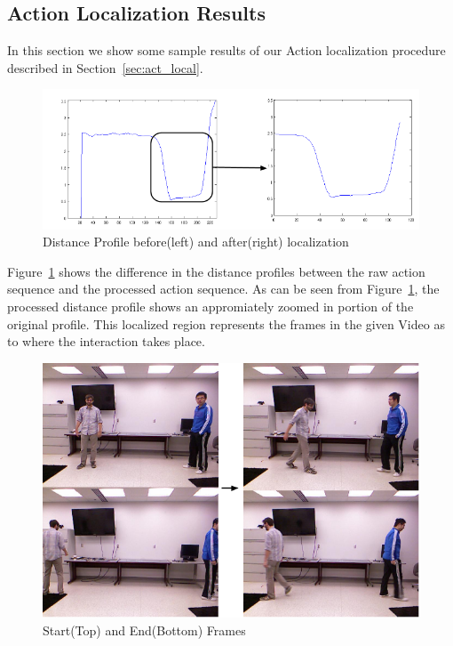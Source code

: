 \documentclass[10pt,twocolumn,letterpaper]{article}
\begin{document}

\subsection{Action Localization Results}
In this section we show some sample results of our Action localization procedure described in Section~\ref{sec:act_local}. 
\begin{figure}[ht]

\includegraphics[scale=0.3]{act_local.png}
\caption{Distance Profile before(left) and after(right) localization}
\label{Fig:act_loc}

\end{figure}
Figure~\ref{Fig:act_loc} shows the difference in the distance profiles between the raw action sequence and the processed action sequence. As can be seen from Figure~\ref{Fig:act_loc}, the processed distance profile shows an appromiately zoomed in portion of the original profile. This localized region represents the frames in the given Video as to where the interaction takes place. 

\begin{figure}[ht]

\includegraphics[scale=0.3]{first_last.png}
\caption{Start(Top) and End(Bottom) Frames}
\label{Fig:top_bot}
\end{figure}
\end{document}
